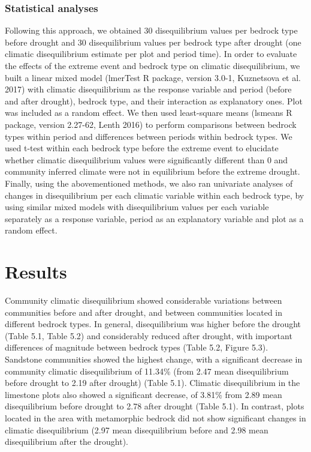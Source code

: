 \documentclass[11pt,twoside]{reedthesis}
\begin{document}
\subsubsection{Statistical analyses}\label{statistical-analyses-2}

Following this approach, we obtained 30 disequilibrium values per
bedrock type before drought and 30 disequilibrium values per bedrock
type after drought (one climatic disequilibrium estimate per plot and
period time). In order to evaluate the effects of the extreme event and
bedrock type on climatic disequilibrium, we built a linear mixed model
(lmerTest R package, version 3.0-1, Kuznetsova et al. 2017) with
climatic disequilibrium as the response variable and period (before and
after drought), bedrock type, and their interaction as explanatory ones.
Plot was included as a random effect. We then used least-square means
(lsmeans R package, version 2.27-62, Lenth 2016) to perform comparisons
between bedrock types within period and differences between periods
within bedrock types. We used t-test within each bedrock type before the
extreme event to elucidate whether climatic disequilibrium values were
significantly different than 0 and community inferred climate were not
in equilibrium before the extreme drought. Finally, using the
abovementioned methods, we also ran univariate analyses of changes in
disequilibrium per each climatic variable within each bedrock type, by
using similar mixed models with disequilibrium values per each variable
separately as a response variable, period as an explanatory variable and
plot as a random effect.\par

\section{Results}\label{results-3}

Community climatic disequilibrium showed considerable variations between
communities before and after drought, and between communities located in
different bedrock types. In general, disequilibrium was higher before
the drought (Table 5.1, Table 5.2) and considerably reduced after
drought, with important differences of magnitude between bedrock types
(Table 5.2, Figure 5.3). Sandstone communities showed the highest
change, with a significant decrease in community climatic disequilibrium
of 11.34\% (from 2.47 mean disequilibrium before drought to 2.19 after
drought) (Table 5.1). Climatic disequilibrium in the limestone plots
also showed a significant decrease, of 3.81\% from 2.89 mean
disequilibrium before drought to 2.78 after drought (Table 5.1). In
contrast, plots located in the area with metamorphic bedrock did not
show significant changes in climatic disequilibrium (2.97 mean
disequilibrium before and 2.98 mean disequilibrium after the
drought).\par
\newpage
\end{document}
